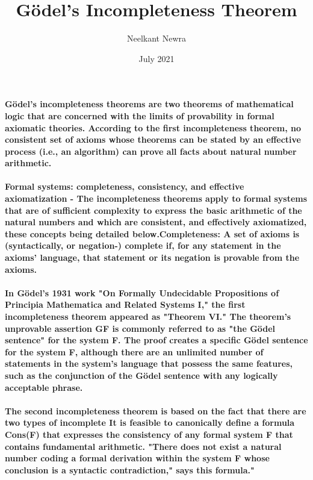 \documentclass{article}
\title{\vspace{-2cm}Gödel's Incompleteness Theorem}
\author{Neelkant Newra }
\date{July 2021}
\begin{document}
\maketitle 
\paragraph{Gödel's incompleteness theorems are two theorems of mathematical logic that are concerned with the limits of provability in formal axiomatic theories. According to the first incompleteness theorem, no consistent set of axioms whose theorems can be stated by an effective process (i.e., an algorithm) can prove all facts about natural number arithmetic.}

\paragraph{Formal systems: completeness, consistency, and effective axiomatization - The incompleteness theorems apply to formal systems that are of sufficient complexity to express the basic arithmetic of the natural numbers and which are consistent, and effectively axiomatized, these concepts being detailed below.Completeness: A set of axioms is (syntactically, or negation-) complete if, for any statement in the axioms' language, that statement or its negation is provable from the axioms.}

\paragraph{In Gödel's 1931 work "On Formally Undecidable Propositions of Principia Mathematica and Related Systems I," the first incompleteness theorem appeared as "Theorem VI."
The theorem's unprovable assertion GF is commonly referred to as "the Gödel sentence" for the system F. The proof creates a specific Gödel sentence for the system F, although there are an unlimited number of statements in the system's language that possess the same features, such as the conjunction of the Gödel sentence with any logically acceptable phrase.}

\paragraph{The second incompleteness theorem is based on the fact that there are two types of incomplete It is feasible to canonically define a formula Cons(F) that expresses the consistency of any formal system F that contains fundamental arithmetic. "There does not exist a natural number coding a formal derivation within the system F whose conclusion is a syntactic contradiction," says this formula."}
\end{document}
